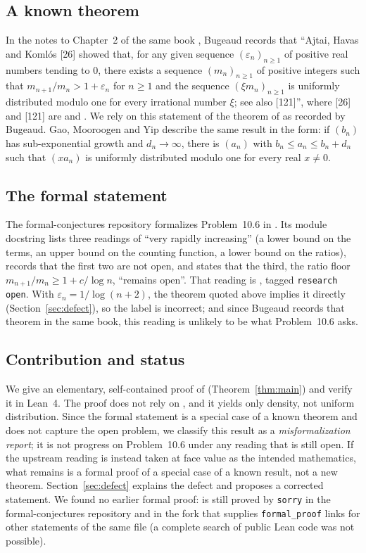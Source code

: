 \documentclass[11pt]{amsart}
\theoremstyle{plain}
\theoremstyle{definition}
\begin{document}
\subsection*{A known theorem}
In the notes to Chapter~2 of the same book \cite[\S2.8, p.~45]{Bug12}, Bugeaud records that ``Ajtai, Havas and Koml\'os [26] showed that, for any given sequence $(\varepsilon_n)_{n\ge1}$ of positive real numbers tending to $0$, there exists a sequence $(m_n)_{n\ge1}$ of positive integers such that $m_{n+1}/m_n>1+\varepsilon_n$ for $n\ge1$ and the sequence $(\xi m_n)_{n\ge1}$ is uniformly distributed modulo one for every irrational number $\xi$; see also [121]'', where [26] and [121] are \cite{AHK83} and \cite{Bos83}.
We rely on this statement of the theorem of \cite{AHK83} as recorded by Bugeaud.
Gao, Mooroogen and Yip \cite[Example~2.4(d)]{GMY} describe the same result in the form: if $(b_n)$ has sub-exponential growth and $d_n\to\infty$, there is $(a_n)$ with $b_n\le a_n\le b_n+d_n$ such that $(xa_n)$ is uniformly distributed modulo one for every real $x\ne0$.

\subsection*{The formal statement}
The formal-conjectures repository \cite{FC} formalizes Problem~10.6 in .
Its module docstring lists three readings of ``very rapidly increasing'' (a lower bound on the terms, an upper bound on the counting function, a lower bound on the ratios), records that the first two are not open, and states that the third, the ratio floor $m_{n+1}/m_n\ge1+c/\log n$, ``remains open''.
That reading is , tagged \texttt{research open}.
With $\varepsilon_n=1/\log(n+2)$, the theorem quoted above implies it directly (Section~\ref{sec:defect}), so the label is incorrect; and since Bugeaud records that theorem in the same book, this reading is unlikely to be what Problem~10.6 asks.

\subsection*{Contribution and status}
We give an elementary, self-contained proof of  (Theorem~\ref{thm:main}) and verify it in Lean~4.
The proof does not rely on \cite{AHK83}, and it yields only density, not uniform distribution.
Since the formal statement is a special case of a known theorem and does not capture the open problem, we classify this result as a \emph{misformalization report}; it is not progress on Problem~10.6 under any reading that is still open.
If the upstream reading is instead taken at face value as the intended mathematics, what remains is a formal proof of a special case of a known result, not a new theorem.
Section~\ref{sec:defect} explains the defect and proposes a corrected statement.
We found no earlier formal proof:  is still proved by \texttt{sorry} in the formal-conjectures repository and in the fork that supplies \texttt{formal\_proof} links for other statements of the same file (a complete search of public Lean code was not possible).
\end{document}
